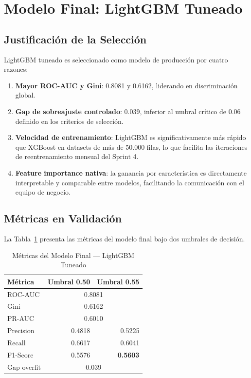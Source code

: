 \documentclass[journal,letterpaper]{IEEEtran}
\begin{document}
\section{Modelo Final: LightGBM Tuneado}

\subsection{Justificación de la Selección}
LightGBM tuneado es seleccionado como modelo de producción por cuatro razones:
\begin{enumerate}
    \item \textbf{Mayor ROC-AUC y Gini}: 0.8081 y 0.6162, liderando en discriminación global.
    \item \textbf{Gap de sobreajuste controlado}: 0.039, inferior al umbral crítico de 0.06 definido en los criterios de selección.
    \item \textbf{Velocidad de entrenamiento}: LightGBM es significativamente más rápido que XGBoost en datasets de más de 50.000 filas, lo que facilita las iteraciones de reentrenamiento mensual del Sprint 4.
    \item \textbf{Feature importance nativa}: la ganancia por característica es directamente interpretable y comparable entre modelos, facilitando la comunicación con el equipo de negocio.
\end{enumerate}

\subsection{Métricas en Validación}
La Tabla~\ref{tab:final_metrics} presenta las métricas del modelo final bajo dos umbrales de decisión.

\begin{table}[h]
\centering
\caption{Métricas del Modelo Final — LightGBM Tuneado}
\label{tab:final_metrics}
\begin{tabular}{lrr}
\toprule
Métrica & Umbral 0.50 & Umbral 0.55 \\
\midrule
ROC-AUC   & \multicolumn{2}{c}{0.8081} \\
Gini      & \multicolumn{2}{c}{0.6162} \\
PR-AUC    & \multicolumn{2}{c}{0.6010} \\
\midrule
Precision  & 0.4818 & 0.5225 \\
Recall     & 0.6617 & 0.6041 \\
F1-Score   & 0.5576 & \textbf{0.5603} \\
\midrule
Gap overfit & \multicolumn{2}{c}{0.039} \\
\bottomrule
\end{tabular}
\end{table}
\end{document}
